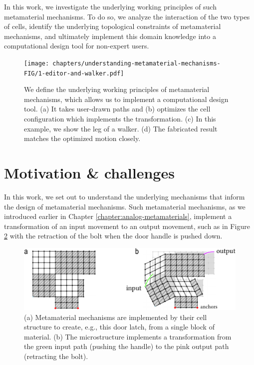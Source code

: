 In this work, we investigate the underlying working principles of such metamaterial mechanisms. To do so, we analyze the interaction of the two types of cells, identify the underlying topological constraints of metamaterial mechanisms, and ultimately implement this domain knowledge into a computational design tool for non-expert users.

\begin{figure} [h]
    \texttt{[image: chapters/understanding-metamaterial-mechanisms-FIG/1-editor-and-walker.pdf]}
    \caption[Short figure name.]{We define the underlying working principles of metamaterial mechanisms, which allows us to implement a computational design tool. (a) It takes user-drawn paths and (b) optimizes the cell configuration which implements the transformation. (c) In this example, we show the leg of a walker. (d) The fabricated result matches the optimized motion closely.
    \label{fig:1-editor-walker}}
\end{figure}


\section{Motivation \& challenges}

In this work, we set out to understand the underlying mechanisms that inform the design of metamaterial mechanisms. Such metamaterial mechanisms, as we introduced earlier in Chapter \ref{chapter:analog-metamaterials}, implement a transformation of an input movement to an output movement, such as in Figure \ref{fig:2-compare-doorlatch} with the retraction of the bolt when the door handle is pushed down.

\begin{figure} [h]
    \includegraphics[width=\textwidth]{chapters/understanding-metamaterial-mechanisms-FIG/2-comparison-doorlatch.pdf}
    \caption[Short figure name.]{(a) Metamaterial mechanisms are implemented by their cell structure to create, e.g., this door latch, from a single block of material. (b) The microstructure implements a transformation from the green input path (pushing the handle) to the pink output path (retracting the bolt).
    \label{fig:2-compare-doorlatch}}
\end{figure}

